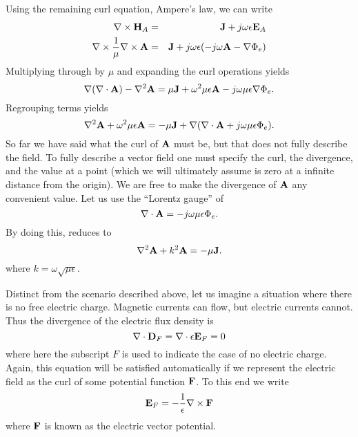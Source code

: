 Using the remaining curl equation, Ampere's law, we can write
\begin{eqnarray}
\nabla\times\mathbf{H}_A &=& \mathbf{J} + j\omega\epsilon\mathbf{E}_A \\
\nabla\times\frac{1}{\mu}\nabla\times\mathbf{A} &=& 
  \mathbf{J} + j\omega\epsilon(-j\omega\mathbf{A} -\nabla\Phi_e)
\end{eqnarray}
Multiplying through by $\mu$ and expanding the curl operations yields
\begin{equation}
\nabla(\nabla\cdot\mathbf{A})-\nabla^2\mathbf{A} 
 = \mu\mathbf{J}
   + \omega^2\mu\epsilon\mathbf{A}
   - j\omega\mu\epsilon\nabla\Phi_e.
\end{equation}
Regrouping terms yields
\begin{equation}
\nabla^2\mathbf{A} + \omega^2\mu\epsilon\mathbf{A}
 = -\mu\mathbf{J}
   +\nabla(\nabla\cdot\mathbf{A} + j\omega\mu\epsilon\Phi_e).
 \label{eq:aVecDiffEqInitial}
\end{equation}
So far we have said what the curl of $\mathbf{A}$ must be, but that does
not fully describe the field.  To fully describe a vector field one
must specify the curl, the divergence, and the value at a point (which
we will ultimately assume is zero at a infinite distance from the
origin).  We are free to make the divergence of $\mathbf{A}$ any convenient
value.  Let us use the ``Lorentz gauge'' of
\begin{equation}
  \nabla\cdot\mathbf{A} =  -j\omega\mu\epsilon\Phi_e.
\end{equation}
By doing this,  reduces to
\begin{equation}
  \nabla^2\mathbf{A} + k^2\mathbf{A} = -\mu\mathbf{J}.
 \label{eq:aVecDiffEq}
\end{equation}
where $k=\omega\sqrt{\mu\epsilon}$.

Distinct from the scenario described above, let us imagine a situation
where there is no free electric charge.  Magnetic currents can flow,
but electric currents cannot.  Thus the divergence of the electric
flux density is
\begin{equation}
  \nabla\cdot \mathbf{D}_F = \nabla\cdot \epsilon \mathbf{E}_F = 0 \label{eq:divDF}
\end{equation}
where here the subscript $F$ is used to indicate the case of no
electric charge.  Again, this equation will be satisfied automatically
if we represent the electric field as the curl of some potential
function $\mathbf{F}$.  To this end we write
\begin{equation}
  \mathbf{E}_F = -\frac{1}{\epsilon}\nabla\times\mathbf{F}
\end{equation}
where $\mathbf{F}$ is known as the electric vector potential.  

